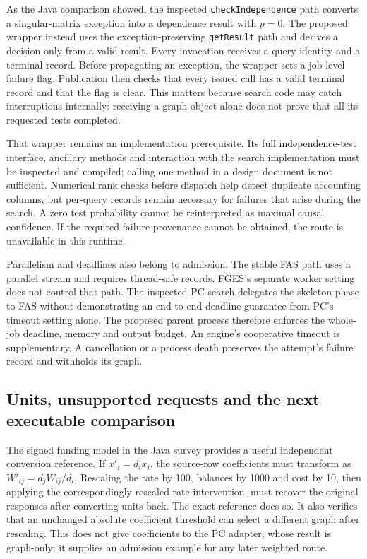 As the Java comparison showed, the inspected \texttt{checkIndependence}
path converts a singular-matrix exception into a dependence result with
\(p=0\). The proposed wrapper instead uses the exception-preserving
\texttt{getResult} path and derives a decision only from a valid result.
Every invocation receives a query identity and a terminal record. Before
propagating an exception, the wrapper sets a job-level failure flag.
Publication then checks that every issued call has a valid terminal
record and that the flag is clear. This matters because search code may
catch interruptions internally: receiving a graph object alone does not
prove that all its requested tests completed.
\citep{exec13_java_tetrad,exec13_java_adapter_source,exec13_java_adapter_contract}

That wrapper remains an implementation prerequisite. Its full
independence-test interface, ancillary methods and interaction with the
search implementation must be inspected and compiled; calling one method
in a design document is not sufficient. Numerical rank checks before
dispatch help detect duplicate accounting columns, but per-query records
remain necessary for failures that arise during the search. A zero test
probability cannot be reinterpreted as maximal causal confidence. If the
required failure provenance cannot be obtained, the route is unavailable
in this runtime. \citep{exec13_java_adapter_contract}

Parallelism and deadlines also belong to admission. The stable FAS path
uses a parallel stream and requires thread-safe records. FGES's separate
worker setting does not control that path. The inspected PC search
delegates the skeleton phase to FAS without demonstrating an end-to-end
deadline guarantee from PC's timeout setting alone. The proposed parent
process therefore enforces the whole-job deadline, memory and output
budget. An engine's cooperative timeout is supplementary. A cancellation
or a process death preserves the attempt's failure record and withholds
its graph.
\citep{exec13_java_adapter_source,exec13_java_adapter_contract}

\hypertarget{units-unsupported-requests-and-the-next-executable-comparison}{%
\subsection{Units, unsupported requests and the next executable
comparison}\label{units-unsupported-requests-and-the-next-executable-comparison}}

The signed funding model in the Java survey provides a useful
independent conversion reference. If \(x'_i=d_i x_i\), the source-row
coefficients must transform as \(W'_{ij}=d_jW_{ij}/d_i\). Rescaling the
rate by 100, balances by 1000 and cost by 10, then applying the
correspondingly rescaled rate intervention, must recover the original
responses after converting units back. The exact reference does so. It
also verifies that an unchanged absolute coefficient threshold can
select a different graph after rescaling. This does not give
coefficients to the PC adapter, whose result is graph-only; it supplies
an admission example for any later weighted route.
\citep{exec13_java_adapter_oracles,exec13_java_examples}

